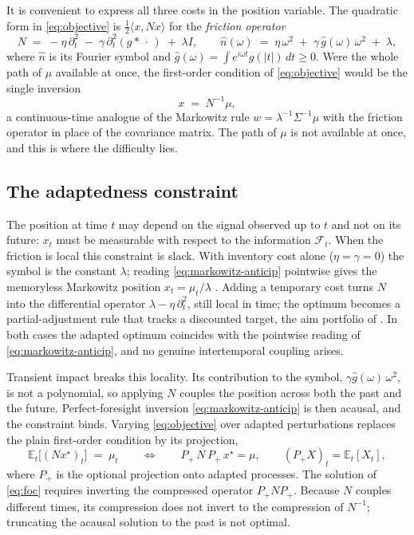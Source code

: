 \documentclass[11pt]{article}
\newcommand{\E}{\mathbb{E}}
\newcommand{\F}{\mathcal{F}}
\theoremstyle{plain}
\theoremstyle{definition}
\theoremstyle{remark}
\begin{document}
It is convenient to express all three costs in the position variable. The quadratic form in \eqref{eq:objective} is $\tfrac12\langle x,Nx\rangle$ for the \emph{friction operator}
\begin{equation}\label{eq:symbol}
N \;=\; -\eta\,\partial_t^2 \;-\; \gamma\,\partial_t^2(g\ast\,\cdot\,) \;+\; \lambda I,
\qquad
\hat n(\omega) \;=\; \eta\,\omega^2 \;+\; \gamma\,\hat g(\omega)\,\omega^2 \;+\; \lambda ,
\end{equation}
where $\hat n$ is its Fourier symbol and $\hat g(\omega)=\int e^{i\omega t}g(|t|)\,dt\ge0$. Were the whole path of $\mu$ available at once, the first-order condition of \eqref{eq:objective} would be the single inversion
\begin{equation}\label{eq:markowitz-anticip}
x \;=\; N^{-1}\mu ,
\end{equation}
a continuous-time analogue of the Markowitz rule $w=\lambda^{-1}\Sigma^{-1}\mu$ with the friction operator in place of the covariance matrix. The path of $\mu$ is not available at once, and this is where the difficulty lies.

\subsection{The adaptedness constraint}\label{sec:adaptedness}

The position at time $t$ may depend on the signal observed up to $t$ and not on its future: $x_t$ must be measurable with respect to the information $\F_t$. When the friction is local this constraint is slack. With inventory cost alone ($\eta=\gamma=0$) the symbol is the constant $\lambda$; reading \eqref{eq:markowitz-anticip} pointwise gives the memoryless Markowitz position $x_t=\mu_t/\lambda$ \citep{Markowitz1952,Merton1971}. Adding a temporary cost turns $N$ into the differential operator $\lambda-\eta\,\partial_t^2$, still local in time; the optimum becomes a partial-adjustment rule that tracks a discounted target, the aim portfolio of \citet{GarleanuPedersen2013,GarleanuPedersen2016}. In both cases the adapted optimum coincides with the pointwise reading of \eqref{eq:markowitz-anticip}, and no genuine intertemporal coupling arises.

Transient impact breaks this locality. Its contribution to the symbol, $\gamma\hat g(\omega)\,\omega^2$, is not a polynomial, so applying $N$ couples the position across both the past and the future. Perfect-foresight inversion \eqref{eq:markowitz-anticip} is then acausal, and the constraint binds. Varying \eqref{eq:objective} over adapted perturbations replaces the plain first-order condition by its projection,
\begin{equation}\label{eq:foc}
\E_t\bigl[(Nx^\star)_t\bigr] \;=\; \mu_t
\qquad\Longleftrightarrow\qquad
P_+\,N\,P_+\,x^\star = \mu ,
\qquad (P_+X)_t = \E_t[X_t],
\end{equation}
where $P_+$ is the optional projection onto adapted processes. The solution of \eqref{eq:foc} requires inverting the compressed operator $P_+NP_+$. Because $N$ couples different times, its compression does not invert to the compression of $N^{-1}$; truncating the acausal solution to the past is not optimal.
\end{document}
